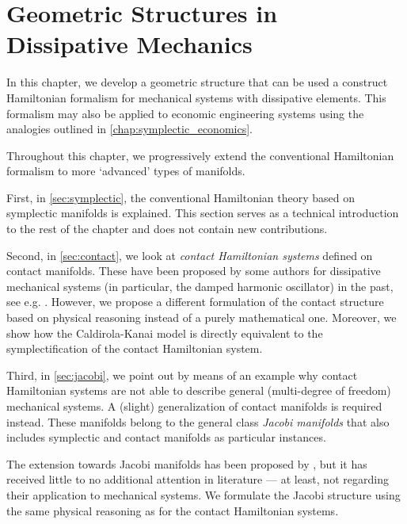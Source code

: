\chapter{Geometric Structures in Dissipative Mechanics}
\label{chap:geometric_structures}

In this chapter, we develop a geometric structure that can be used a construct Hamiltonian formalism for mechanical systems with dissipative elements. This formalism may also be applied to economic engineering systems using the analogies outlined in \cref{chap:symplectic_economics}.

Throughout this chapter, we progressively extend the conventional Hamiltonian formalism to more `advanced' types of manifolds.

First, in \cref{sec:symplectic}, the conventional Hamiltonian theory based on symplectic manifolds is explained. This section serves as a technical introduction to the rest of the chapter and does not contain new contributions.

Second, in \cref{sec:contact}, we look at \emph{contact Hamiltonian systems} defined on contact manifolds. These have been proposed by some authors for dissipative mechanical systems (in particular, the damped harmonic oscillator) in the past, see e.g. \citet{Bravetti2015}. However, we propose a different formulation of the contact structure based on physical reasoning instead of a purely mathematical one. Moreover, we show how the Caldirola-Kanai model is directly equivalent to the symplectification of the contact Hamiltonian system.

Third, in \cref{sec:jacobi}, we point out by means of an example why contact Hamiltonian systems are not able to describe general (multi-degree of freedom) mechanical systems. A (slight) generalization of contact manifolds is required instead. These manifolds belong to the general class \emph{Jacobi manifolds} that also includes symplectic and contact manifolds as particular instances. 

The extension towards Jacobi manifolds has been proposed by \citet{ciaglia2018}, but it has received little to no additional attention in literature --- at least, not regarding their application to mechanical systems. We formulate the Jacobi structure using the same physical reasoning as for the contact Hamiltonian systems.






